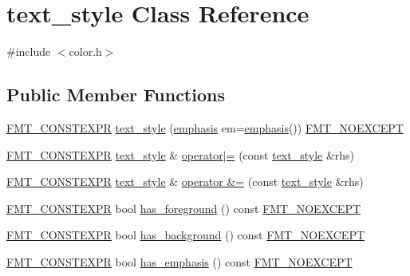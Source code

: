 \hypertarget{classtext__style}{}\section{text\+\_\+style Class Reference}
\label{classtext__style}


{\ttfamily \#include $<$color.\+h$>$}

\subsection*{Public Member Functions}
\begin{DoxyCompactItemize}
\item 
\hyperlink{core_8h_a69201cb276383873487bf68b4ef8b4cd}{F\+M\+T\+\_\+\+C\+O\+N\+S\+T\+E\+X\+PR} \hyperlink{classtext__style_a67f289d8275892ad458966e9d44cd246}{text\+\_\+style} (\hyperlink{color_8h_a535b59b8edc8902bb3c4f254625f91ba}{emphasis} em=\hyperlink{color_8h_a535b59b8edc8902bb3c4f254625f91ba}{emphasis}()) \hyperlink{core_8h_aef128913e8400683b1cbd1a3a2e11df3}{F\+M\+T\+\_\+\+N\+O\+E\+X\+C\+E\+PT}
\item 
\hyperlink{core_8h_a69201cb276383873487bf68b4ef8b4cd}{F\+M\+T\+\_\+\+C\+O\+N\+S\+T\+E\+X\+PR} \hyperlink{classtext__style}{text\+\_\+style} \& \hyperlink{classtext__style_aaa488412bf58f9a9760b421dea9aeaa9}{operator$\vert$=} (const \hyperlink{classtext__style}{text\+\_\+style} \&rhs)
\item 
\hyperlink{core_8h_a69201cb276383873487bf68b4ef8b4cd}{F\+M\+T\+\_\+\+C\+O\+N\+S\+T\+E\+X\+PR} \hyperlink{classtext__style}{text\+\_\+style} \& \hyperlink{classtext__style_a347bf58ff73936da8f35bbb4f595975b}{operator \&=} (const \hyperlink{classtext__style}{text\+\_\+style} \&rhs)
\item 
\hyperlink{core_8h_a69201cb276383873487bf68b4ef8b4cd}{F\+M\+T\+\_\+\+C\+O\+N\+S\+T\+E\+X\+PR} bool \hyperlink{classtext__style_ad605ce62796a99d87f0e9744617cf402}{has\+\_\+foreground} () const \hyperlink{core_8h_aef128913e8400683b1cbd1a3a2e11df3}{F\+M\+T\+\_\+\+N\+O\+E\+X\+C\+E\+PT}
\item 
\hyperlink{core_8h_a69201cb276383873487bf68b4ef8b4cd}{F\+M\+T\+\_\+\+C\+O\+N\+S\+T\+E\+X\+PR} bool \hyperlink{classtext__style_afa9f90cd308a4a4b61ab8f6d6178a581}{has\+\_\+background} () const \hyperlink{core_8h_aef128913e8400683b1cbd1a3a2e11df3}{F\+M\+T\+\_\+\+N\+O\+E\+X\+C\+E\+PT}
\item 
\hyperlink{core_8h_a69201cb276383873487bf68b4ef8b4cd}{F\+M\+T\+\_\+\+C\+O\+N\+S\+T\+E\+X\+PR} bool \hyperlink{classtext__style_a57443deabb81d0e013d81813fc4d55cb}{has\+\_\+emphasis} () const \hyperlink{core_8h_aef128913e8400683b1cbd1a3a2e11df3}{F\+M\+T\+\_\+\+N\+O\+E\+X\+C\+E\+PT}

\end{DoxyCompactItemize}

